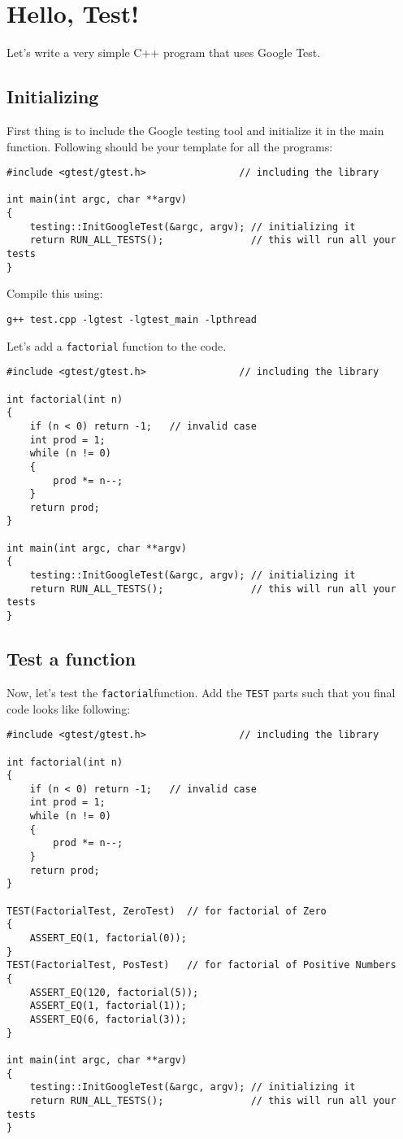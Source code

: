 \section{Hello, Test!}
Let's write a very simple C++ program that uses Google Test.
\subsection{Initializing}
First thing is to include the Google testing tool and initialize it in
the main function. Following should be your template for all the
programs:
\begin{Verbatim}[frame=single]
#include <gtest/gtest.h>                // including the library
  
int main(int argc, char **argv)
{
    testing::InitGoogleTest(&argc, argv); // initializing it
    return RUN_ALL_TESTS();               // this will run all your tests
}
\end{Verbatim}

Compile this using:
\begin{Verbatim}[frame=single]
g++ test.cpp -lgtest -lgtest_main -lpthread
\end{Verbatim}
Let's add a \verb!factorial! function to the code.
\begin{Verbatim}[frame=single]
#include <gtest/gtest.h>                // including the library

int factorial(int n)
{
    if (n < 0) return -1;   // invalid case
    int prod = 1;
    while (n != 0)
    {
        prod *= n--;
    }
    return prod;
}

int main(int argc, char **argv)
{
    testing::InitGoogleTest(&argc, argv); // initializing it
    return RUN_ALL_TESTS();               // this will run all your tests
}
\end{Verbatim}

\newpage

\subsection{Test a function}
Now, let's test the \verb!factorial!function. Add the \verb!TEST! parts such
that
you final code looks
like following:
\begin{Verbatim}[frame=single]
#include <gtest/gtest.h>                // including the library
  
int factorial(int n)
{
    if (n < 0) return -1;   // invalid case
    int prod = 1;
    while (n != 0)
    {
        prod *= n--;
    }
    return prod;
}

TEST(FactorialTest, ZeroTest)  // for factorial of Zero
{
    ASSERT_EQ(1, factorial(0));
}
TEST(FactorialTest, PosTest)   // for factorial of Positive Numbers
{
    ASSERT_EQ(120, factorial(5));
    ASSERT_EQ(1, factorial(1));
    ASSERT_EQ(6, factorial(3));
}

int main(int argc, char **argv)
{
    testing::InitGoogleTest(&argc, argv); // initializing it
    return RUN_ALL_TESTS();               // this will run all your tests
}  
\end{Verbatim}

